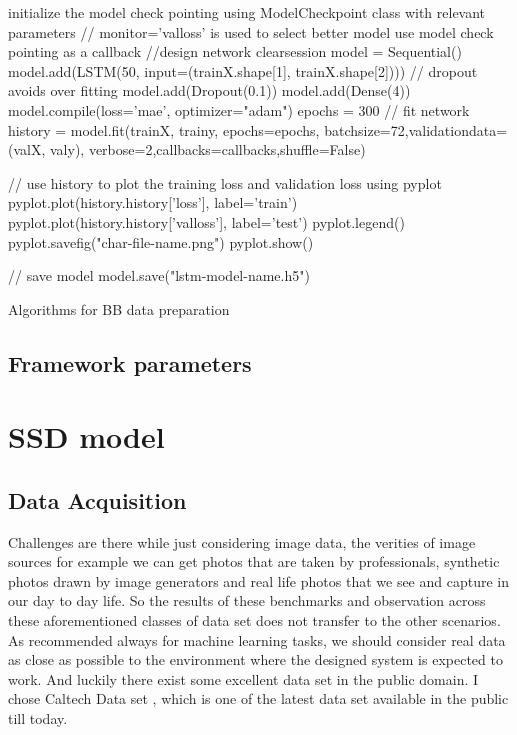 \begin{algorithm}[H]
\SetAlgoLined
{}
 initialize the model check pointing using ModelCheckpoint class with relevant parameters\;
 // monitor='val\textunderscore loss' is used to select better model\;
	use model check pointing as a callback\;
 //design network\;
 clear\textunderscore session\;
 model = Sequential()\;
 model.add(LSTM(50, input\textunderscore =(train\textunderscore X.shape[1], train\textunderscore X.shape[2])))
 // dropout avoids over fitting
 model.add(Dropout(0.1))
 model.add(Dense(4))
 model.compile(loss='mae', optimizer="adam")
 epochs = 300
 // fit network
 history = model.fit(train\textunderscore X, train\textunderscore y, epochs=epochs, batch\textunderscore size=72,validation\textunderscore data=(val\textunderscore X, val\textunderscore y), verbose=2,callbacks=callbacks,shuffle=False)

 // use history to plot the training loss and validation loss using pyplot
 pyplot.plot(history.history['loss'], label='train')
 pyplot.plot(history.history['val\textunderscore loss'], label='test')
 pyplot.legend()
 pyplot.savefig("char-file-name.png")
 pyplot.show()

// save model
model.save("lstm-model-name.h5")
 \caption{Algorithms for BB data preparation}
\end{algorithm}

\subsection{Framework parameters}


\section{SSD model}

\subsection{Data Acquisition}
Challenges are there while just considering image data, the verities of image sources for example we can get photos that are taken by professionals, synthetic photos drawn by image generators and real life photos that we see and capture in our day to day life. So the results of these benchmarks and 
observation across these aforementioned classes of data set does not transfer to the other scenarios.
As recommended always for machine learning tasks, we should consider real data as close as possible to the environment where the designed system is expected to work. And luckily there exist some excellent data set in the public domain. I chose Caltech Data set \cite{dollar2009pedestrian}, which is one of the latest data set available in the public till today. 

